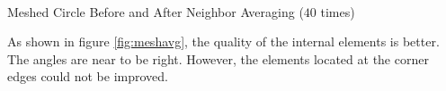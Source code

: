 \documentclass[a4paper,12pt]{article}
\makeatletter
\newenvironment{figurehere}
  {\def\@captype{figure}}
  {}
\makeatother
\begin{document}
\begin{center}
\begin{figurehere}
\\
\caption{Meshed Circle Before and After Neighbor Averaging ($40$ times)}\label{fig:meshavg}
\end{figurehere}
\end{center}
As shown in figure \ref{fig:meshavg}, the quality of the internal elements is better. The angles are near to be right. However, the elements located at the corner edges could not be improved.\\
\end{document}
